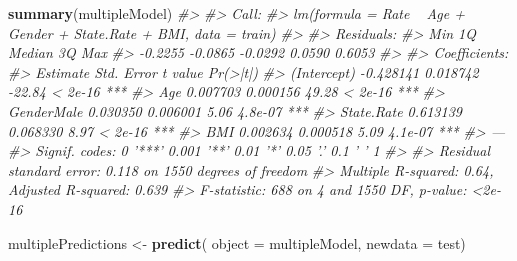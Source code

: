 \documentclass[]{book}
\newenvironment{Shaded}{\begin{snugshade}}{\end{snugshade}}
\newcommand{\CommentTok}[1]{\textcolor[rgb]{0.56,0.35,0.01}{\textit{#1}}}
\newcommand{\DataTypeTok}[1]{\textcolor[rgb]{0.13,0.29,0.53}{#1}}
\newcommand{\DecValTok}[1]{\textcolor[rgb]{0.00,0.00,0.81}{#1}}
\newcommand{\KeywordTok}[1]{\textcolor[rgb]{0.13,0.29,0.53}{\textbf{#1}}}
\newcommand{\NormalTok}[1]{#1}
\newcommand{\OperatorTok}[1]{\textcolor[rgb]{0.81,0.36,0.00}{\textbf{#1}}}
\newcommand{\StringTok}[1]{\textcolor[rgb]{0.31,0.60,0.02}{#1}}
\begin{document}
\begin{Shaded}
\begin{Highlighting}[]
\KeywordTok{summary}\NormalTok{(multipleModel)}
\CommentTok{#> }
\CommentTok{#> Call:}
\CommentTok{#> lm(formula = Rate ~ Age + Gender + State.Rate + BMI, data = train)}
\CommentTok{#> }
\CommentTok{#> Residuals:}
\CommentTok{#>     Min      1Q  Median      3Q     Max }
\CommentTok{#> -0.2255 -0.0865 -0.0292  0.0590  0.6053 }
\CommentTok{#> }
\CommentTok{#> Coefficients:}
\CommentTok{#>              Estimate Std. Error t value Pr(>|t|)    }
\CommentTok{#> (Intercept) -0.428141   0.018742  -22.84  < 2e-16 ***}
\CommentTok{#> Age          0.007703   0.000156   49.28  < 2e-16 ***}
\CommentTok{#> GenderMale   0.030350   0.006001    5.06  4.8e-07 ***}
\CommentTok{#> State.Rate   0.613139   0.068330    8.97  < 2e-16 ***}
\CommentTok{#> BMI          0.002634   0.000518    5.09  4.1e-07 ***}
\CommentTok{#> ---}
\CommentTok{#> Signif. codes:  0 '***' 0.001 '**' 0.01 '*' 0.05 '.' 0.1 ' ' 1}
\CommentTok{#> }
\CommentTok{#> Residual standard error: 0.118 on 1550 degrees of freedom}
\CommentTok{#> Multiple R-squared:  0.64,   Adjusted R-squared:  0.639 }
\CommentTok{#> F-statistic:  688 on 4 and 1550 DF,  p-value: <2e-16}
\end{Highlighting}
\end{Shaded}

\begin{Shaded}
\begin{Highlighting}[]
\NormalTok{multiplePredictions <-}\StringTok{ }\KeywordTok{predict}\NormalTok{(}
  \DataTypeTok{object =}\NormalTok{ multipleModel,}
  \DataTypeTok{newdata =}\NormalTok{ test)}
\end{Highlighting}
\end{Shaded}

\begin{Shaded}
\end{Shaded}
\end{document}
